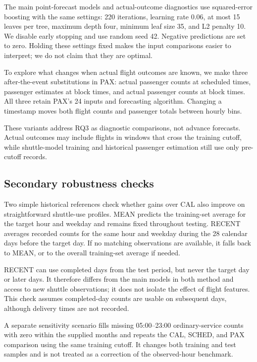 \documentclass[preprint,12pt,times]{elsarticle}
\begin{document}
The main point-forecast models and actual-outcome diagnostics use squared-error boosting with the same settings: 220 iterations, learning rate 0.06, at most 15 leaves per tree, maximum depth four, minimum leaf size 35, and L2 penalty 10. We disable early stopping and use random seed 42. Negative predictions are set to zero. Holding these settings fixed makes the input comparisons easier to interpret; we do not claim that they are optimal.

To explore what changes when actual flight outcomes are known, we make three after-the-event substitutions in PAX: actual passenger counts at scheduled times, passenger estimates at block times, and actual passenger counts at block times. All three retain PAX's 24 inputs and forecasting algorithm. Changing a timestamp moves both flight counts and passenger totals between hourly bins.

These variants address RQ3 as diagnostic comparisons, not advance forecasts. Actual outcomes may include flights in windows that cross the training cutoff, while shuttle-model training and historical passenger estimation still use only pre-cutoff records.


\subsection{Secondary robustness checks}
Two simple historical references check whether gains over CAL also improve on straightforward shuttle-use profiles. MEAN predicts the training-set average for the target hour and weekday and remains fixed throughout testing. RECENT averages recorded counts for the same hour and weekday during the 28 calendar days before the target day. If no matching observations are available, it falls back to MEAN, or to the overall training-set average if needed.

RECENT can use completed days from the test period, but never the target day or later days. It therefore differs from the main models in both method and access to new shuttle observations; it does not isolate the effect of flight features. This check assumes completed-day counts are usable on subsequent days, although delivery times are not recorded.

A separate sensitivity scenario fills missing 05:00--23:00 ordinary-service counts with zero within the supplied months and repeats the CAL, SCHED, and PAX comparison using the same training cutoff. It changes both training and test samples and is not treated as a correction of the observed-hour benchmark.
\end{document}
